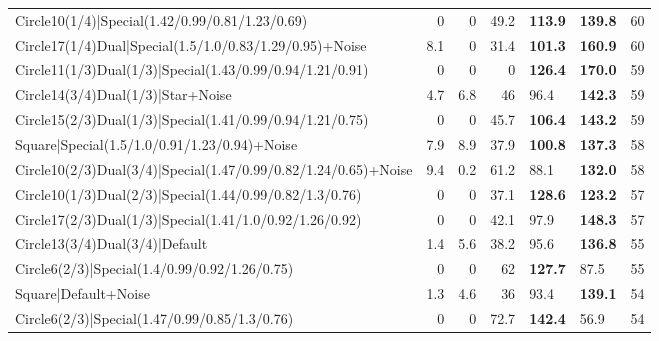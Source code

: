 \begin{tabular}{lrrrllr}
 Circle10(1/4)|Special(1.42/0.99/0.81/1.23/0.69)                &          0   &            0   &          49.2 & \textbf{113.9} & \textbf{139.8} &           60 \\
 Circle17(1/4)Dual|Special(1.5/1.0/0.83/1.29/0.95)+Noise        &          8.1 &            0   &          31.4 & \textbf{101.3} & \textbf{160.9} &           60 \\
 Circle11(1/3)Dual(1/3)|Special(1.43/0.99/0.94/1.21/0.91)       &          0   &            0   &           0   & \textbf{126.4} & \textbf{170.0} &           59 \\
 Circle14(3/4)Dual(1/3)|Star+Noise                              &          4.7 &            6.8 &          46   & 96.4           & \textbf{142.3} &           59 \\
 Circle15(2/3)Dual(1/3)|Special(1.41/0.99/0.94/1.21/0.75)       &          0   &            0   &          45.7 & \textbf{106.4} & \textbf{143.2} &           59 \\
 Square|Special(1.5/1.0/0.91/1.23/0.94)+Noise                   &          7.9 &            8.9 &          37.9 & \textbf{100.8} & \textbf{137.3} &           58 \\
 Circle10(2/3)Dual(3/4)|Special(1.47/0.99/0.82/1.24/0.65)+Noise &          9.4 &            0.2 &          61.2 & 88.1           & \textbf{132.0} &           58 \\
 Circle10(1/3)Dual(2/3)|Special(1.44/0.99/0.82/1.3/0.76)        &          0   &            0   &          37.1 & \textbf{128.6} & \textbf{123.2} &           57 \\
 Circle17(2/3)Dual(1/3)|Special(1.41/1.0/0.92/1.26/0.92)        &          0   &            0   &          42.1 & 97.9           & \textbf{148.3} &           57 \\
 Circle13(3/4)Dual(3/4)|Default                                 &          1.4 &            5.6 &          38.2 & 95.6           & \textbf{136.8} &           55 \\
 Circle6(2/3)|Special(1.4/0.99/0.92/1.26/0.75)                  &          0   &            0   &          62   & \textbf{127.7} & 87.5           &           55 \\
 Square|Default+Noise                                           &          1.3 &            4.6 &          36   & 93.4           & \textbf{139.1} &           54 \\
 Circle6(2/3)|Special(1.47/0.99/0.85/1.3/0.76)                  &          0   &            0   &          72.7 & \textbf{142.4} & 56.9           &           54 \\

\end{tabular}
